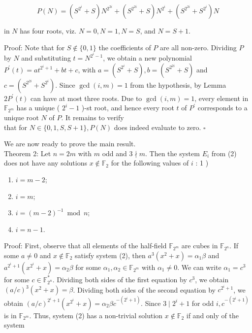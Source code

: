 \documentclass[10pt]{article}
\begin{document}
$$
P(N)=\left(S^{2^{i}}+S\right) N^{2^{2 i}}+\left(S^{2^{2 i}}+S\right) N^{2^{i}}+\left(S^{2^{2 i}}+S^{2^{i}}\right) N
$$

in $N$ has four roots, viz. $N=0, N=1, N=S$, and $N= S+1$.

Proof: Note that for $S \notin\{0,1\}$ the coefficients of $P$ are all non-zero. Dividing $P$ by $N$ and substituting $t=N^{2^{i}-1}$, we obtain a new polynomial $P^{\prime}(t)=a t^{2^{i}+1}+b t+c$, with $a=\left(S^{2^{i}}+S\right), b=\left(S^{2^{2 i}}+S\right)$ and $c=\left(S^{2^{2 i}}+S^{2^{i}}\right)$. Since $\operatorname{gcd}(i, m)=1$ from the hypothesis, by Lemma $2 P^{\prime}(t)$ can have at most three roots. Due to $\operatorname{gcd}(i, m)=1$, every element in $\mathbb{F}_{2^{m}}$ has a unique ( $2^{i}-1$ )-st root, and hence every root $t$ of $P^{\prime}$ corresponds to a unique root $N$ of $P$. It remains to verify\\
that for $N \in\{0,1, S, S+1\}, P(N)$ does indeed evaluate to zero. \(\square\)

We are now ready to prove the main result.\\
Theorem 2: Let $n=2 m$ with $m$ odd and $3 \nmid m$. Then the system $E_{i}$ from (2) does not have any solutions $x \notin \mathbb{F}_{2}$ for the following values of $i$ : 1 )

\begin{enumerate}
  \item $i=m-2$;
  \item $i=m$;
  \item $i=(m-2)^{-1} \bmod n$;
  \item $i=n-1$.
\end{enumerate}

Proof: First, observe that all elements of the half-field $\mathbb{F}_{2^{m}}$ are cubes in $\mathbb{F}_{2^{n}}$. If some $a \neq 0$ and $x \notin \mathbb{F}_{2}$ satisfy system (2), then $a^{3}\left(x^{2}+x\right)=\alpha_{1} \beta$ and $a^{2^{i}+1}\left(x^{2^{i}}+x\right)=\alpha_{2} \beta$ for some $\alpha_{1}, \alpha_{2} \in \mathbb{F}_{2^{m}}$ with $\alpha_{1} \neq 0$. We can write $\alpha_{1}=c^{3}$ for some $c \in \mathbb{F}_{2^{n}}^{*}$. Dividing both sides of the first equation by $c^{3}$, we obtain $(a / c)^{3}\left(x^{2}+x\right)=\beta$. Dividing both sides of the second equation by $c^{2^{i}+1}$, we obtain $(a / c)^{2^{i}+1}\left(x^{2^{i}}+x\right)= \alpha_{2} \beta c^{-\left(2^{i}+1\right)}$. Since $3 \mid 2^{i}+1$ for odd $i, c^{-\left(2^{i}+1\right)}$ is in $\mathbb{F}_{2^{m}}$. Thus, system (2) has a non-trivial solution $x \notin \mathbb{F}_{2}$ if and only of the system
\end{document}
